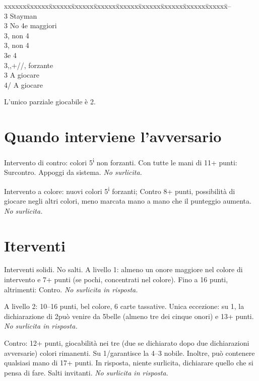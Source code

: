 \documentclass[a4paper,italian,12pt]{article}
\newcommand\SA{{\smaller{SA}}\xspace}
\newenvironment{bidtable}
{\begin{tabbing}

    xxxxxx\=xxxxxx\=xxxxxx\=xxxxxx\=xxxxxx\=xxxxxx\=xxxxxx\=xxxxxx\=xxxxxx\=xxxxxx\=\kill}
{\end{tabbing} }%
\begin{document}
\begin{bidtable}
    2\SA--\+\\
    3\Cl\>\> Stayman\+\+\\
    3\Di\> No 4e maggiori\\
    3\He {}\He, non 4\Sp\\
    3\Sp {}\Sp, non 4\He\\
    3\SA {}\He e 4\Sp\-\-\\
    3\Di,\He,\Sp \>+\Di/\He/\Sp, forzante\\
    3\SA \>\> A giocare\\
    4\He/\Sp \>\> A giocare
\end{bidtable}
L'unico parziale giocabile è 2\SA.

\section*{Quando interviene l'avversario}
Intervento di contro: colori 5\textsuperscript{i} non forzanti. Con tutte le mani di 11+ punti: Surcontro. Appoggi da sistema. \emph{No surlicita.}

Intervento a colore: nuovi colori 5\textsuperscript{i} forzanti; Contro 8+ punti, possibilità di giocare negli altri
colori, meno marcata mano a mano che il punteggio aumenta. \emph{No surlicita.}

\section*{Iterventi}
Interventi solidi. No salti. A livello 1: almeno un onore maggiore nel colore di intervento e 7+ punti (se pochi, concentrati nel
colore). Fino a 16 punti, altrimenti: Contro. \emph{No surlicita in risposta.}

A livello 2: 10--16 punti, bel colore, 6 carte tassative. Unica eccezione: su 1\Sp, la dichiarazione di 2\He può venire
da 5\He belle (almeno tre dei cinque onori) e 13+ punti. \emph{No surlicita in risposta.}

Contro: 12+ punti, giocabilità nei tre (due se dichiarato dopo due dichiarazioni avversarie) colori rimanenti. Su
1\Cl/\Di garantisce la 4--3 nobile. Inoltre, può contenere qualsiasi mano
di 17+ punti. In risposta, niente surlicita, dichiarare quello che si pensa di fare. Salti invitanti. \emph{No surlicita in risposta.}
\end{document}
